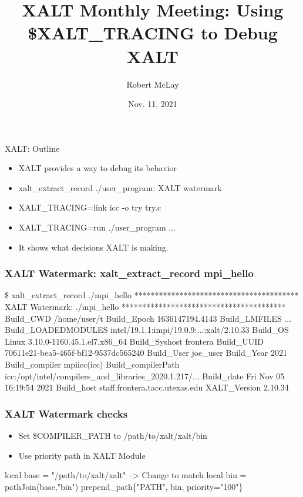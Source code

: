 \documentclass{beamer}
\begin{document}
\title[XALT]{XALT Monthly Meeting: Using \$XALT\_TRACING to Debug XALT}
\author{Robert McLay} 
\date{Nov. 11, 2021} 

\frame{\titlepage} 

\begin{frame}{XALT: Outline}
  \begin{itemize}
    \item XALT provides a way to debug its behavior
    \item xalt\_extract\_record ./user\_program: XALT watermark
    \item XALT\_TRACING=link  icc -o try try.c
    \item XALT\_TRACING=run ./user\_program ...
    \item It shows what decisions XALT is making.
  \end{itemize}
\end{frame}

\begin{frame}[fragile]
    \frametitle{XALT Watermark: xalt\_extract\_record mpi\_hello}
 {\tiny
    \begin{semiverbatim}
\$ xalt_extract_record ./mpi_hello 
****************************************
XALT Watermark: ./mpi_hello
****************************************
Build_CWD                /home/user/t
Build_Epoch              1636147194.4143
Build_LMFILES            ...
Build_LOADEDMODULES      intel/19.1.1:impi/19.0.9:...:xalt/2.10.33
Build_OS                 Linux 3.10.0-1160.45.1.el7.x86_64
Build_Syshost            frontera
Build_UUID               70611e21-bea5-465f-bf12-9537dc565240
Build_User               joe_user
Build_Year               2021
Build_compiler           mpiicc(icc)
Build_compilerPath       icc:/opt/intel/compilers_and_libraries_2020.1.217/...
Build_date               Fri Nov 05 16:19:54 2021
Build_host               staff.frontera.tacc.utexas.edu
XALT_Version             2.10.34
    \end{semiverbatim}
}
\end{frame}

\begin{frame}[fragile]
    \frametitle{XALT Watermark checks} 
  \begin{itemize}
    \item Set \$COMPILER\_PATH to /path/to/xalt/xalt/bin
    \item Use priority path in XALT Module
  \end{itemize}
 {\small
    \begin{semiverbatim}
local base  = "/path/to/xalt/xalt"  --> Change to match 
local bin   = pathJoin(base,"bin")
prepend_path\{"PATH",  bin, priority="100"\}
    \end{semiverbatim}
}
\end{frame}
\end{document}

